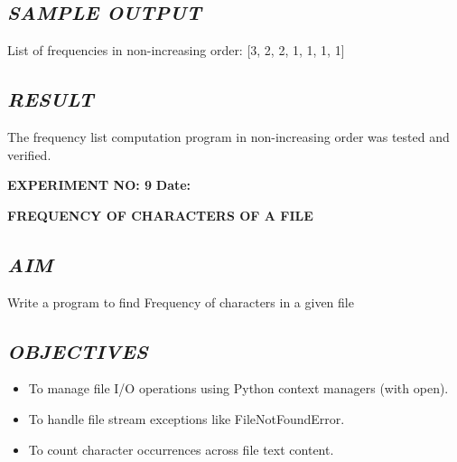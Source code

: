 \documentclass[11pt,a4paper]{article}
\begin{document}
\subsection*{\textit{SAMPLE OUTPUT}}
\begin{tcolorbox}[colback=black!85,colframe=navyblue,title=\textbf{Terminal Output},coltitle=white,fonttitle=\bfseries\small]
\small\ttfamily\color{green!30!white}
List of frequencies in non-increasing order: [3, 2, 2, 1, 1, 1, 1]
\end{tcolorbox}

\subsection*{\textit{RESULT}}
The frequency list computation program in non-increasing order was tested and verified.

\newpage

\noindent
\textbf{\large EXPERIMENT NO: 9} \hfill \textbf{\large Date: \underline{\hspace{3cm}}}

\vspace{0.2cm}
\begin{center}
{\Huge \textbf{\textcolor{navyblue}{FREQUENCY OF CHARACTERS OF A FILE}}}
\end{center}
\vspace{0.3cm}

\subsection*{\textit{AIM}}
Write a program to find Frequency of characters in a given file

\subsection*{\textit{OBJECTIVES}}
\begin{itemize}
  \item To manage file I/O operations using Python context managers (with open).
  \item To handle file stream exceptions like FileNotFoundError.
  \item To count character occurrences across file text content.
\end{itemize}
\end{document}
